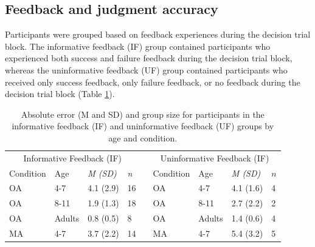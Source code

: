 \documentclass[a4paper,man,natbib,floatsintext,noextraspace]{apa6}
\begin{document}
\subsection{Feedback and judgment accuracy}

Participants were grouped based on feedback experiences during the decision trial block. The informative feedback (IF) group contained participants who experienced both success and failure feedback during the decision trial block, whereas the uninformative feedback (UF) group contained participants who received only success feedback, only failure feedback, or no feedback during the decision trial block (Table \ref{tab:1}). 

\begin{table}
\caption{Absolute error (M and SD) and group size for participants in the informative feedback (IF) and uninformative feedback (UF) groups by age and condition.}
\label{tab:1}
\begin{tabular}{@{}lllllllll@{}}
\multicolumn{4}{c}{Informative Feedback (IF)}                                                                                   &                       & \multicolumn{4}{c}{Uninformative Feedback (IF)}                                                                  \\ 
\multicolumn{1}{l}{Condition} & \multicolumn{1}{l}{Age} & \multicolumn{1}{l}{\textit{M (SD)}} & \multicolumn{1}{l}{\textit{n}} & \multicolumn{1}{l}{} & \multicolumn{1}{l}{Condition} & \multicolumn{1}{l}{Age} & \multicolumn{1}{l}{\textit{M (SD)}} & \multicolumn{1}{l}{$n$} \\ \midrule
OA                              & 4-7                      & 4.1 (2.9)                            & 16                              &                       & OA                             & 4-7                      & 4.1 (1.6)                   & 4                      \\
OA                              & 8-11                     & 1.9 (1.3)                            & 18                              &                       & OA                             & 8-11                     & 2.7 (2.2)                   & 2                      \\
OA                              & Adults                   & 0.8 (0.5)                            & 8                               &                       & OA                             & Adults                   & 1.4 (0.6)                   & 4                      \\
MA                              & 4-7                      & 3.7 (2.2)                            & 14                              &                       & MA                             & 4-7                      & 5.4 (3.2)                   & 5                      \\

\end{tabular}
\end{table}
\end{document}
